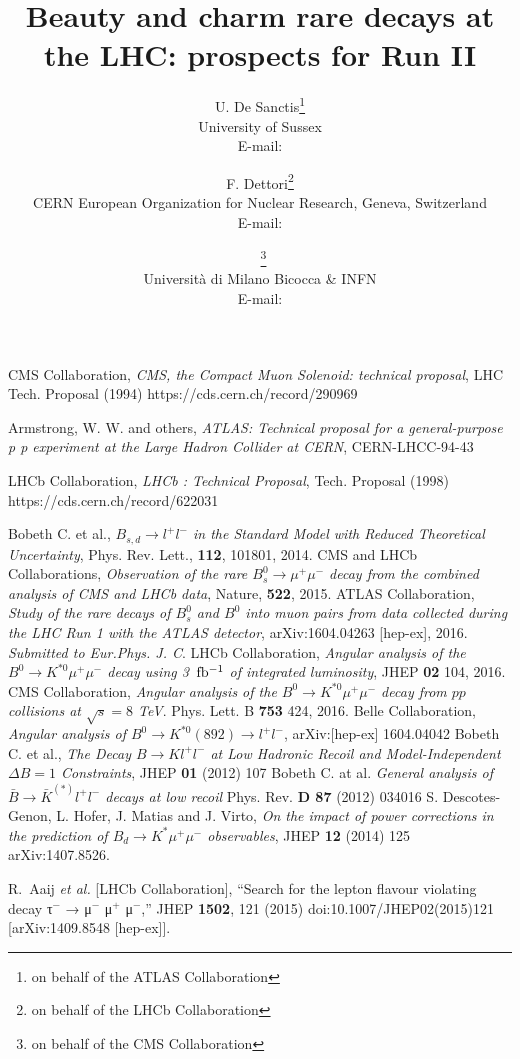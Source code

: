 \documentclass{PoS}
\title{Beauty and charm rare decays at the LHC: prospects for Run II}
\author{U. De Sanctis\thanks{on behalf of the ATLAS Collaboration}\\
        University of Sussex\\
        E-mail: \email{umberto.de.sanctis@cern.ch}\\}
\author{F. Dettori\thanks{on behalf of the LHCb Collaboration}\\
        CERN European Organization for Nuclear Research, Geneva, Switzerland\\
        E-mail: \email{francesco.dettori@cern.ch}\\ }
\author{\speaker{S. Fiorendi}~\thanks{on behalf of the CMS Collaboration}\\
       Universit\`a di Milano Bicocca \& INFN\\
        E-mail: \email{sara.fiorendi@cern.ch}
	}
\begin{document}





\begin{thebibliography}{99}
 CMS Collaboration, 
{\it{CMS, the Compact Muon Solenoid: technical proposal}},
LHC Tech. Proposal (1994) 
https://cds.cern.ch/record/290969

 Armstrong, W. W. and others, 
{\it{ATLAS: Technical proposal for a general-purpose p p experiment at the Large Hadron Collider at CERN}},
CERN-LHCC-94-43 

 LHCb Collaboration, 
{\it{LHCb : Technical Proposal}},
Tech. Proposal (1998) https://cds.cern.ch/record/622031

 Bobeth C. et al., {\it{$B_{s,d} \to l^+ l^-$ in the Standard Model with Reduced Theoretical Uncertainty}}, Phys. Rev. Lett., {\bf{112}}, 101801, 2014.
 CMS and LHCb Collaborations, {\it{Observation of the rare $B^0_s\rightarrow\mu^+\mu^-$ decay from the combined analysis of CMS and LHCb data}}, Nature, {\bf{522}}, 2015.
 ATLAS Collaboration, {\it{Study of the rare decays of $B^0_s$ and $B^0$  into muon pairs from data collected during the LHC Run 1 with the ATLAS detector}}, arXiv:1604.04263 [hep-ex], 2016. {\it{Submitted to Eur.Phys. J. C}}.
 LHCb Collaboration, {\it{Angular analysis of the $B^0 \to K^{*0}  \mu^+ \mu^-$ decay using 3~${\rm{fb^{-1}}}$ of integrated luminosity}}, JHEP {\bf{02}} 104, 2016. 
 CMS Collaboration, {\it{Angular analysis of the $B^0 \to K^{*0}  \mu^+ \mu^-$  decay from $pp$ collisions at $\sqrt{s} = 8$ TeV}}. Phys. Lett. B {\bf{753}} 424, 2016.
 Belle Collaboration, {\it{Angular analysis of $B^0 \to K^{*0}(892) \to l^+ l^-$}}, arXiv:[hep-ex] 1604.04042
 Bobeth C. et al., {\it{The Decay $B \to K l^+ l^-$ at Low Hadronic Recoil and Model-Independent $\Delta B = 1$ Constraints}}, JHEP {\bf{01}} (2012) 107 \newline
Bobeth C. at al. {\it{General analysis of $\bar{B} \to \bar{K}^{(*)} l^+ l^−$ decays at low recoil}} Phys. Rev. {\bf{D 87}} (2012) 034016
 S. Descotes-Genon, L. Hofer, J. Matias and J. Virto, {\it{On the impact of power corrections in the prediction of $B_d \to K^* \mu^+ \mu^-$ observables}}, JHEP {\bf{12}} (2014) 125 arXiv:1407.8526.


  R.~Aaij {\it et al.} [LHCb Collaboration],
  ``Search for the lepton flavour violating decay τ$^{−}$ → μ$^{−}$ μ$^{+}$ μ$^{−}$,''
  JHEP {\bf 1502}, 121 (2015)
  doi:10.1007/JHEP02(2015)121
  [arXiv:1409.8548 [hep-ex]].


\end{thebibliography}
\end{document}
